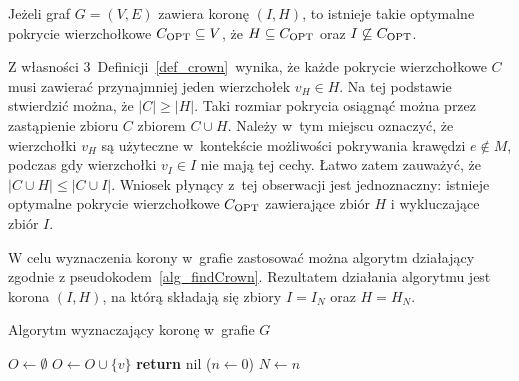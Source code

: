 \begin{theorem}
  Jeżeli graf $G=(V,E)$ zawiera koronę $(I,H)$, to istnieje takie optymalne pokrycie wierzchołkowe $C_{\textnormal{OPT}} \subseteq V$, że $H \subseteq C_{\textnormal{OPT}}$ oraz $I \not\subseteq C_{\textnormal{OPT}}$.
\end{theorem}
\begin{bproof}
  Z własności 3\ Definicji~\ref{def_crown}\ wynika, że każde pokrycie wierzchołkowe $C$ musi zawierać przynajmniej jeden wierzchołek $v_H \in H$.
  Na tej podstawie stwierdzić można, że $|C|\geq|H|$.
  Taki rozmiar pokrycia osiągnąć można przez zastąpienie zbioru $C$ zbiorem $C\cup H$.
  Należy w~tym miejscu oznaczyć, że wierzchołki $v_H$ są użyteczne w~kontekście możliwości pokrywania krawędzi $e \notin M$, podczas gdy wierzchołki $v_I \in
  I$ nie mają tej cechy.
  Łatwo zatem zauważyć, że $|C \cup H| \leq |C \cup I|$.
  Wniosek płynący z~tej obserwacji jest jednoznaczny: istnieje optymalne pokrycie wierzchołkowe $C_{\textnormal{OPT}}$ zawierające zbiór $H$ i wykluczające zbiór $I$.
\end{bproof}
W celu wyznaczenia korony w~grafie zastosować można algorytm działający zgodnie z pseudokodem~\ref{alg_findCrown}.
Rezultatem działania algorytmu jest korona $(I,H)$, na którą składają się zbiory $I=I_N$ oraz $H=H_N$.
\begin{algorithm}
  \caption{Algorytm wyznaczający koronę w~grafie $G$}\label{alg_findCrown}
  \begin{algorithmic}[1]



    \State $O \gets \emptyset$
        \State $O \gets O \cup \{v\}$
      \EndIf
    \EndFor
     
      \State\textbf{return} nil
    \EndIf
   
  \EndIf
  \State($n \gets 0$)
  \label{findCrown_while}
    \label{findCrown_makeH}
    \label{findCrown_makeI}
  \EndWhile\label{findCrown_endWhile}
  \State $N \gets n$
  \EndFunction
\end{algorithmic}
\end{algorithm}
